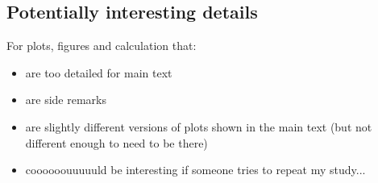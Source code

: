 \subsection{Potentially interesting details}

For plots, figures and calculation that:
\begin{itemize}
  \item are too detailed for main text
  \item are side remarks
  \item are slightly different versions of plots shown in the main text (but not different enough to need to be there)
  \item coooooouuuuuld be interesting if someone tries to repeat my study...
\end{itemize}
